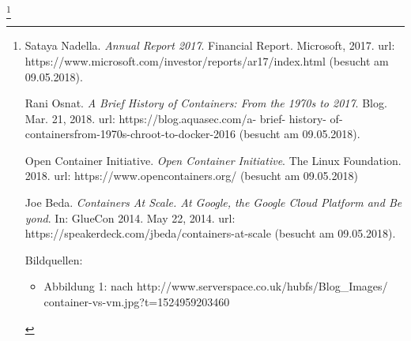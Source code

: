 \let\thefootnote\relax\footnote{
{
\vspace{0.1mm}
\begin{minipage}[t]{\linewidth}
 \begin{list}{\textcolor{black}{[]}}{\setlength{\labelwidth}{2cm}\setlength{\leftmargin}{0.5cm}\setlength{\itemsep}{-1mm}}\item Sataya Nadella. \textit{Annual Report 2017}. Financial Report. Microsoft, 2017. url: https://www.microsoft.com/investor/reports/ar17/index.html (besucht am 09.05.2018).
\item Rani Osnat. \textit{A Brief History of Containers: From the 1970s to 2017}. Blog. Mar. 21, 2018. url: https://blog.aquasec.com/a- brief- history- of- containersfrom-1970s-chroot-to-docker-2016 (besucht am 09.05.2018).
\item Open Container Initiative. \textit{Open Container Initiative}. The Linux Foundation. 2018. url: https://www.opencontainers.org/ (besucht am 09.05.2018)
\item Joe Beda. \textit{Containers At Scale. At Google, the Google Cloud Platform and Be
yond}. In: GlueCon 2014. May 22, 2014. url: https://speakerdeck.com/jbeda/containers-at-scale (besucht am 09.05.2018).
\end{list}
Bildquellen:
\begin{itemize}
\item Abbildung 1: nach http://www.serverspace.co.uk/hubfs/Blog\_Images/ \\ container-vs-vm.jpg?t=1524959203460
\end{itemize}
\end{minipage}
}}
\newpage
